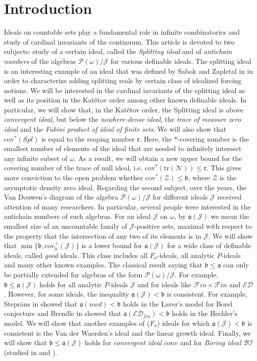 \documentclass[a4paper]{amsart}
\newcommand{\aaa}{\mathfrak{a}}
\newcommand{\bbb}{\mathfrak{b}}
\newcommand{\rrr}{\mathfrak{r}}
\newcommand{\Null}{\mathcal{N}}
\newcommand{\cov}{\mathrm{cov}}
\newcommand{\J}{\mathcal{J}}
\newcommand{\ED}{\mathcal{ED}}
\newcommand{\FF}{\mathcal{F}in\times\mathcal{F}in}
\newcommand{\nwd}{nwd}
\newcommand{\Z}{\mathcal{Z}}
\newcommand{\SPL}{\mathcal{S}pl}
\newcommand{\conv}{conv}
\newcommand{\trN}{\mathrm{tr}(\Null)}
\newcommand{\BI}{\mathcal{BI}}
\begin{document}
\section{Introduction}
Ideals on countable sets play a fundamental role in infinite combinatorics and study of cardinal invariants of the continuum. This article is devoted to two subjects: study of a certain ideal, called the \emph{Splitting ideal} and of \emph{antichain numbers} of the algebras $\mathcal{P}(\omega)/\J$ for various definable ideals. The splitting ideal is an interesting example of an ideal that was defined by Sabok and Zapletal in \cite{SabZapl} in order to characterize adding splitting reals by certain class of idealized forcing notions. We will be interested in the cardinal invariants of the splitting ideal as well as its position in the Katětov order among other known definable ideals. In particular, we will show that, in the Katětov order, the Splitting ideal is above \emph{convergent ideal}, but below the \emph{nowhere-dense ideal}, the \emph{trace of measure zero ideal} and the \emph{Fubini product of ideal of finite sets}. We will also show that $\cov^{*}(\SPL)$ is equal to the reaping number $\rrr$. Here, the $*$-covering number is the smallest number of elements of the ideal that are needed to infinitely intersect any infinite subset of $\omega$. As a result, we will obtain a new upper bound for the covering number of the trace of null ideal, i.e. $\cov^{*}(\trN)\leq\rrr$. This gives more conviction to the open problem whether $\cov^{*}(\Z)\leq\bbb$, where $\Z$ is the asymptotic density zero ideal. Regarding the second subject, over the years, the Van Douwen's diagram of the algebra $\mathcal{P}(\omega)/\J$ for different ideals $\J$ received attention of many researchers. In particular, several people were interested in the antichain numbers of such algebras. For an ideal $\J$ on $\omega$, by $\aaa(\J)$ we mean the smallest size of an uncountable family of $\J$-positive sets, maximal with respect to the property that the intersection of any two of its elements is in $\J$. We will show that $\min\{\bbb,\cov^{+}_{h}(\J)\}$ is a lower bound for $\aaa(\J)$ for a wide class of definable ideals, called \emph{good} ideals. This class includes all $F_{\sigma}$-ideals, all analytic $P$-ideals and many other known examples. The classical result saying that $\bbb\leq\aaa$ can only be partially extended for algebras of the form $\mathcal{P}(\omega)/\J$. For example, $\bbb\leq\aaa(\J)$ holds for all analytic $P$-ideals $\J$ and for ideals like $\FF$ and $\ED$. However, for some ideals, the inequality $\aaa(\J)<\bbb$ is consistent. For example, Steprāns in \cite{Steprans} showed that $\aaa(\nwd)<\bbb$ holds in the Laver's model for Borel conjecture and Brendle in \cite{BrendleAntichains} showed that $\aaa(\ED_{fin})<\bbb$ holds in the Hechler's model. We will show that another examples of ($F_{\sigma}$) ideals for which $\aaa(\J)<\bbb$ is consistent is the Van der Waerden's ideal and the linear growth ideal. Finally, we will show that $\bbb\leq\aaa(\J)$ holds for \emph{convergent ideal} $\conv$ and for \emph{Boring ideal} $\BI$ (studied in \cite{KwelaUnboring} and \cite{BrendleGuzHruRaghavan}).\\
\end{document}
